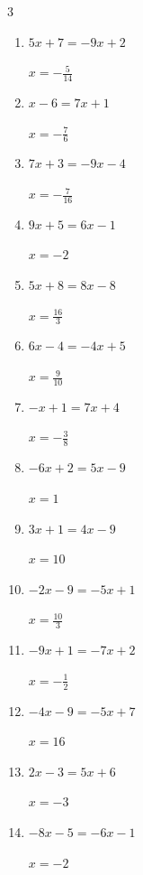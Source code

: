 \begin{multicols}{3}
\begin{enumerate}
        $\displaystyle x=\frac{6}{13}$

  \item $5x+7=-9x+2$

        $\displaystyle x=-\frac{5}{14}$

  \item $x-6=7x+1$

        $\displaystyle x=-\frac{7}{6}$

  \item $7x+3=-9x-4$

        $\displaystyle x=-\frac{7}{16}$

  \item $9x+5=6x-1$

        $\displaystyle x=-2$

  \item $5x+8=8x-8$

        $\displaystyle x=\frac{16}{3}$

  \item $6x-4=-4x+5$

        $\displaystyle x=\frac{9}{10}$

  \item $-x+1=7x+4$

        $\displaystyle x=-\frac{3}{8}$

  \item $-6x+2=5x-9$

        $\displaystyle x=1$

\columnbreak %

  \item $3x+1=4x-9$

        $\displaystyle x=10$

  \item $-2x-9=-5x+1$

        $\displaystyle x=\frac{10}{3}$

  \item $-9x+1=-7x+2$

        $\displaystyle x=-\frac{1}{2}$

  \item $-4x-9=-5x+7$

        $\displaystyle x=16$

  \item $2x-3=5x+6$

        $\displaystyle x=-3$

  \item $-8x-5=-6x-1$

        $\displaystyle x=-2$


\end{enumerate}
\end{multicols}
